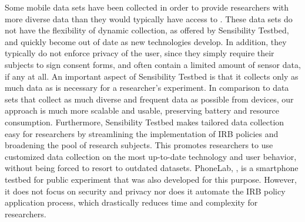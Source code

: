 

Some mobile data sets have been collected in order to provide
researchers with more diverse data than they would typically have
access to \cite{kiukkonen2010towards, wagner2014device}. These data
sets do not have the flexibility of dynamic collection, as offered by
Sensibility Testbed, and quickly become out of date as new
technologies develop. In addition, they typically do not enforce
privacy of the user, since they simply require their subjects to sign
consent forms, and often contain a limited amount of sensor data, if
any at all. An important aspect of Sensibility Testbed is that it
collects only as much data as is necessary for a researcher's
experiment. In comparison to data sets that collect as much diverse
and frequent data as possible from devices, our approach is much more
scalable and usable, preserving battery and resource consumption.
Furthermore, Sensibility Testbed makes tailored data collection easy
for researchers by streamlining the implementation of IRB policies and
broadening the pool of research subjects. This promotes researchers to
use customized data collection on the most up-to-date technology and
user behavior, without being forced to resort to outdated datasets.
PhoneLab, \cite{nandugudi2013phonelab}, is a smartphone testbed for
public experiment that was also developed for this purpose. However,
it does not focus on security and privacy nor does it automate the IRB
policy application process, which drastically reduces time and
complexity for researchers.
